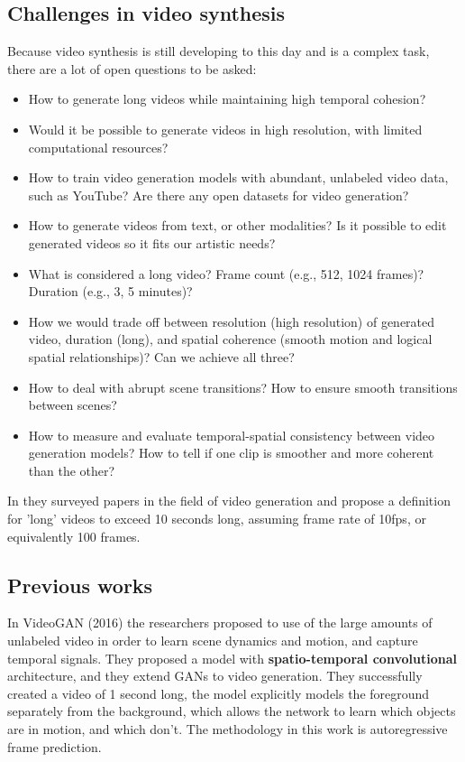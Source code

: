 \subsection*{Challenges in video synthesis}

Because video synthesis is still developing to this day and is a complex task, there are a lot of open questions to be asked:

\begin{itemize}
    \item How to generate long videos while maintaining high temporal cohesion?
    \item Would it be possible to generate videos in high resolution, with limited computational resources?
    \item How to train video generation models with abundant, unlabeled video data, such as YouTube? Are there any open datasets for video generation?
    \item How to generate videos from text, or other modalities? Is it possible to edit generated videos so it fits our artistic needs?
    \item What is considered a long video? Frame count (e.g., 512, 1024 frames)? Duration (e.g., 3, 5 minutes)?
    \item How we would trade off between resolution (high resolution) of generated video, duration (long), and spatial coherence (smooth motion and logical spatial relationships)? Can we achieve all three?
    \item How to deal with abrupt scene transitions? How to ensure smooth transitions between scenes?
    \item How to measure and evaluate temporal-spatial consistency between video generation models? How to tell if one clip is smoother and more coherent than the other?
\end{itemize}

In \cite{long_video_survey} they surveyed papers in the field of video generation and propose a definition for 'long' videos to exceed 10 seconds long, assuming frame rate of 10fps, or equivalently 100 frames.








\subsection{Previous works}

In VideoGAN \cite{video_gan} (2016) the researchers proposed to use of the large amounts of unlabeled video in order to learn scene dynamics and motion, and capture temporal signals. They proposed a model with \textbf{spatio-temporal convolutional} architecture, and they extend GANs to video generation. They successfully created a video of 1 second long, the model explicitly models the foreground separately from the background, which allows the network to learn which objects are in motion, and which don't. The methodology in this work is autoregressive frame prediction.

